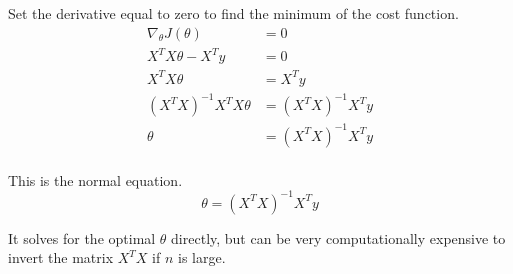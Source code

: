 \documentclass{article}
\begin{document}
Set the derivative equal to zero to find the minimum of the cost function.
\begin{align*}
\nabla_\theta J(\theta) &= 0\\
X^TX\theta - X^Ty &= 0\\
X^TX\theta &= X^Ty\\
{(X^TX)}^{-1}X^TX\theta &= {(X^TX)}^{-1}X^Ty\\
\theta &= {(X^TX)}^{-1}X^Ty\\
\end{align*}


This is the normal equation.
\begin{equation}
\theta = {(X^TX)}^{-1}X^Ty
\end{equation}

It solves for the optimal $\theta$ directly, but can be very computationally expensive to invert the matrix $X^TX$ if $n$ is large.
\end{document}
